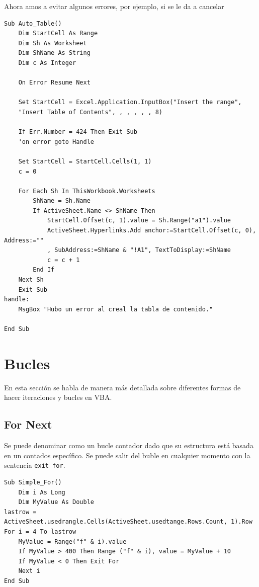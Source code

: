 Ahora amos a evitar algunos errores, por ejemplo, si se le da a cancelar


\begin{verbatim}
Sub Auto_Table()
    Dim StartCell As Range
    Dim Sh As Worksheet
    Dim ShName As String
    Dim c As Integer
    
    On Error Resume Next
    
    Set StartCell = Excel.Application.InputBox("Insert the range",
    "Insert Table of Contents", , , , , , 8)
    
    If Err.Number = 424 Then Exit Sub
    'on error goto Handle
    
    Set StartCell = StartCell.Cells(1, 1)
    c = 0
    
    For Each Sh In ThisWorkbook.Worksheets
        ShName = Sh.Name
        If ActiveSheet.Name <> ShName Then
            StartCell.Offset(c, 1).value = Sh.Range("a1").value
            ActiveSheet.Hyperlinks.Add anchor:=StartCell.Offset(c, 0), Address:=""
            , SubAddress:=ShName & "!A1", TextToDisplay:=ShName
            c = c + 1
        End If
    Next Sh
    Exit Sub
handle:
    MsgBox "Hubo un error al creal la tabla de contenido."
    
End Sub
\end{verbatim}


\section{Bucles}

En esta sección se habla de manera más detallada sobre diferentes formas de hacer iteraciones y bucles en VBA.

\subsection{For Next}

Se puede denominar como un bucle contador dado que su estructura está basada en un contados específico. Se puede salir del buble en cualquier momento con la sentencia \texttt{exit for}.

\begin{verbatim}
Sub Simple_For()
    Dim i As Long
    Dim MyValue As Double
lastrow = ActiveSheet.usedrangle.Cells(ActiveSheet.usedtange.Rows.Count, 1).Row
For i = 4 To lastrow
    MyValue = Range("f" & i).value
    If MyValue > 400 Then Range ("f" & i), value = MyValue + 10
    If MyValue < 0 Then Exit For
    Next i
End Sub
\end{verbatim}

